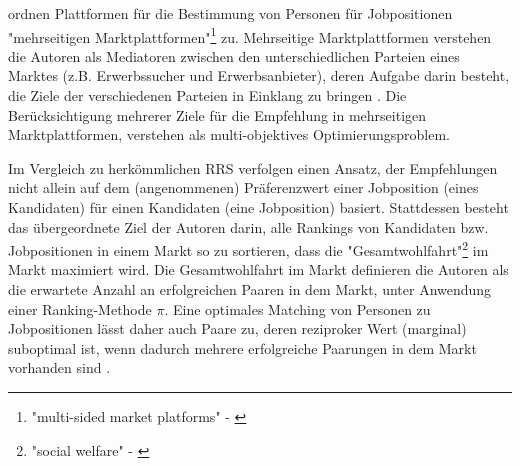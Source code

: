 

\textcite[S. 329]{su:inproceedings} ordnen Plattformen für die Bestimmung von Personen für Jobpositionen "mehrseitigen Marktplattformen"\footnote{"multi-sided market platforms" - \textcite[S. 329]{su:inproceedings}} zu.
Mehrseitige Marktplattformen verstehen die Autoren als Mediatoren zwischen den unterschiedlichen Parteien eines Marktes (z.B. Erwerbssucher und Erwerbsanbieter), deren Aufgabe darin besteht, die Ziele der verschiedenen Parteien in Einklang zu bringen \cite[S. 329]{su:inproceedings}.
Die Berücksichtigung mehrerer Ziele für die Empfehlung in mehrseitigen Marktplattformen, verstehen \textcite[S. 329]{su:inproceedings} als multi-objektives Optimierungsproblem.

Im Vergleich zu herkömmlichen \ac{RRS} verfolgen \textcite[S. 328ff.]{su:inproceedings} einen Ansatz, der Empfehlungen nicht allein auf dem (angenommenen) Präferenzwert einer Jobposition (eines Kandidaten) für einen Kandidaten (eine Jobposition) basiert.
Stattdessen besteht das übergeordnete Ziel der Autoren darin, alle Rankings von Kandidaten bzw. Jobpositionen in einem Markt so zu sortieren, dass die "Gesamtwohlfahrt"\footnote{"social welfare" - \textcite[S. 329]{su:inproceedings}} im Markt maximiert wird.
Die Gesamtwohlfahrt im Markt definieren die Autoren als die erwartete Anzahl an erfolgreichen Paaren in dem Markt, unter Anwendung einer Ranking-Methode $\pi$.
Eine optimales Matching von Personen zu Jobpositionen lässt daher auch Paare zu, deren reziproker Wert (marginal) suboptimal ist, wenn dadurch mehrere erfolgreiche Paarungen in dem Markt vorhanden sind \cite[S. 334]{su:inproceedings}.

